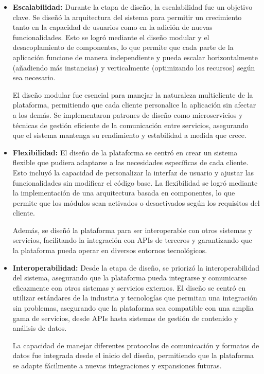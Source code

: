 \begin{itemize}
    \item \textbf{Escalabilidad:} Durante la etapa de diseño, la escalabilidad fue un objetivo clave. 
    Se diseñó la arquitectura del sistema para permitir un crecimiento tanto en la capacidad de usuarios 
    como en la adición de nuevas funcionalidades. Esto se logró mediante el diseño modular y el desacoplamiento
     de componentes, lo que permite que cada parte de la aplicación funcione de manera independiente y pueda 
     escalar horizontalmente (añadiendo más instancias) y verticalmente (optimizando los recursos) según sea necesario.

    El diseño modular fue esencial para manejar la naturaleza multicliente de la plataforma, permitiendo que 
    cada cliente personalice la aplicación sin afectar a los demás. Se implementaron patrones de diseño como 
    microservicios y técnicas de gestión eficiente de la comunicación entre servicios, asegurando que el sistema 
    mantenga su rendimiento y estabilidad a medida que crece.

    \item \textbf{Flexibilidad:} El diseño de la plataforma se centró en crear un sistema flexible que pudiera 
    adaptarse a las necesidades específicas de cada cliente. Esto incluyó la capacidad de personalizar la interfaz 
    de usuario y ajustar las funcionalidades sin modificar el código base. La flexibilidad se logró mediante la 
    implementación de una arquitectura basada en componentes, lo que permite que los módulos sean activados o desactivados 
    según los requisitos del cliente.

    Además, se diseñó la plataforma para ser interoperable con otros sistemas y servicios, facilitando la integración con 
    APIs de terceros y garantizando que la plataforma pueda operar en diversos entornos tecnológicos.

    \item \textbf{Interoperabilidad:} Desde la etapa de diseño, se priorizó la interoperabilidad del sistema, asegurando 
    que la plataforma pueda integrarse y comunicarse eficazmente con otros sistemas y servicios externos. El diseño se 
    centró en utilizar estándares de la industria y tecnologías que permitan una integración sin problemas, asegurando 
    que la plataforma sea compatible con una amplia gama de servicios, desde APIs hasta sistemas de gestión de contenido y análisis de datos.

    La capacidad de manejar diferentes protocolos de comunicación y formatos de datos fue integrada desde el inicio del 
    diseño, permitiendo que la plataforma se adapte fácilmente a nuevas integraciones y expansiones futuras.


\end{itemize}

